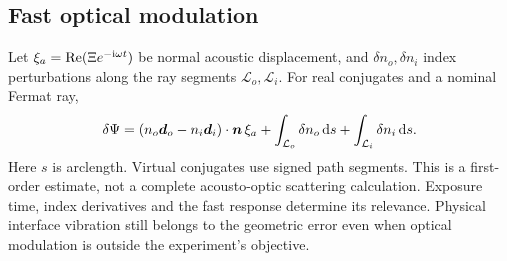 \subsection{Fast optical modulation}
Let $\xi_a=\operatorname{Re}(\Xi e^{-\mathrm i\omega t})$ be normal acoustic displacement,
and $\delta n_o,\delta n_i$ index perturbations along the ray segments
$\mathcal L_o,\mathcal L_i$. For real conjugates and a nominal Fermat ray,
\begin{equation}
 \delta\Psi=(n_o\bm d_o-n_i\bm d_i)\cdot\bm n\,\xi_a
       +\int_{\mathcal L_o}\delta n_o\,\mathrm d s
       +\int_{\mathcal L_i}\delta n_i\,\mathrm d s.
 \label{eq:fast-optical-error}
\end{equation}
Here $s$ is arclength. Virtual conjugates use signed path segments. This is a
first-order estimate, not a complete acousto-optic scattering calculation.
Exposure time, index derivatives and the fast response determine its relevance.
Physical interface vibration still belongs to the geometric error even when
optical modulation is outside the experiment's objective.
